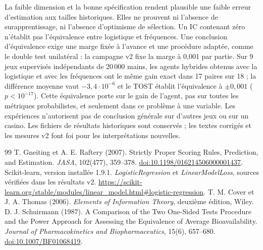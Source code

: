 \documentclass[11pt,a4paper]{article}
\theoremstyle{remark}\newtheorem*{remarque}{Remarque}
\newcommand{\1}{\mathbf 1}
\begin{document}
La faible dimension et la bonne spécification rendent plausible une faible erreur
d'estimation aux tailles historiques. Elles ne prouvent ni l'absence de
surapprentissage, ni l'absence d'optimisme de sélection. Un IC contenant zéro
n'établit pas l'équivalence entre logistique et fréquences. Une conclusion
d'équivalence exige une marge fixée à l'avance et une procédure adaptée, comme le
double test unilatéral \cite{tost} : la campagne v2 fixe la marge à 0,001 par partie.
Sur 9 jeux supervisés indépendants de 20\,000 mains, les agents hybrides obtenus avec
la logistique et avec les fréquences ont le même gain exact dans 17 paires sur 18 ;
la différence moyenne vaut $-3{,}4\cdot10^{-6}$ et le TOST établit l'équivalence à
$\pm0{,}001$ ($p<10^{-17}$). Cette équivalence porte sur le gain de l'agent, pas sur
toutes les métriques probabilistes, et seulement dans ce problème à une variable. Les expériences
n'autorisent pas de conclusion générale sur d'autres jeux ou sur un casino.
Les fichiers de résultats historiques sont conservés ; les textes corrigés et les
mesures v2 font foi pour les interprétations nouvelles.

\begin{thebibliography}{99}
 T. Gneiting et A. E. Raftery (2007). Strictly Proper Scoring
Rules, Prediction, and Estimation. \emph{JASA}, 102(477), 359--378.
\href{https://doi.org/10.1198/016214506000001437}{doi:10.1198/016214506000001437}.
 Scikit-learn, version installée 1.9.1.
\emph{LogisticRegression} et \emph{LinearModelLoss}, sources vérifiées dans les
résultats v2.
\url{https://scikit-learn.org/stable/modules/linear_model.html#logistic-regression}.
 T. M. Cover et J. A. Thomas (2006).
\emph{Elements of Information Theory}, deuxième édition, Wiley.
 D. J. Schuirmann (1987). A Comparison of the Two One-Sided Tests
Procedure and the Power Approach for Assessing the Equivalence of Average
Bioavailability. \emph{Journal of Pharmacokinetics and Biopharmaceutics}, 15(6),
657--680. \href{https://doi.org/10.1007/BF01068419}{doi:10.1007/BF01068419}.
\end{thebibliography}
\end{document}
